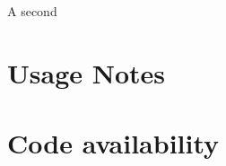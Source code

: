 \documentclass[fleqn,10pt]{wlscirep}
\begin{document}
A second 

\section*{Usage Notes}  \label{sec:usage}



\section*{Code availability}




\end{document}
